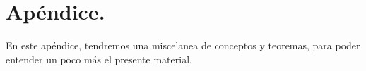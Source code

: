 \chapter*{Apéndice.}

En este apéndice, tendremos una miscelanea de conceptos y teoremas, para poder entender un poco más el presente material.

